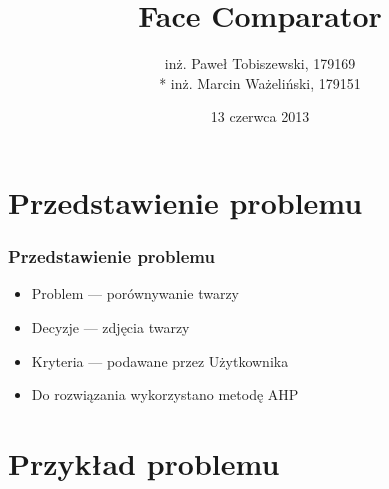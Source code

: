 \documentclass{beamer}
\title{Face Comparator}
\author[PT MW]{
	inż. Paweł Tobiszewski, 179169\\*
	inż. Marcin Ważeliński, 179151
}
\institute[PWr]{Wydział Informatyki i Zarządzania, Politechnika Wrocławska}
\date{13 czerwca 2013}
\begin{document}
\begin{frame}
	\titlepage
\end{frame}

\section{Przedstawienie problemu}
\begin{frame}
\frametitle{Przedstawienie problemu}
	\begin{itemize}
	\item Problem --- porównywanie twarzy
	\item Decyzje --- zdjęcia twarzy
	\item Kryteria --- podawane przez Użytkownika
	\item Do rozwiązania wykorzystano metodę AHP
	\end{itemize}
\end{frame}

\section{Przykład problemu}
\end{document}
